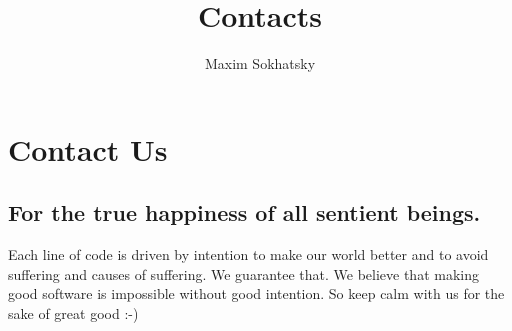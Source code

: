 \documentclass[11pt]{article}
\begin{document}
\title{Contacts}
\author{Maxim Sokhatsky}


\section*{Contact Us}

\subsection*{For the true happiness of all sentient beings.}

Each line of code is driven by intention to make our world better and to
avoid suffering and causes of suffering. We guarantee that.
We believe that making good software is impossible without good intention.
So keep calm with us for the sake of great good :-)


\end{document}
